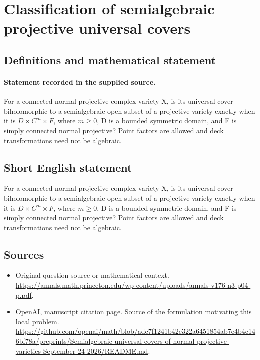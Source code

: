 \documentclass[11pt]{article}
\begin{document}
\section*{Classification of semialgebraic projective universal covers}\label{30007062}
\subsection{Definitions and mathematical statement}
\paragraph{Statement recorded in the supplied source.}
For a connected normal projective complex variety X, is its universal cover biholomorphic to a semialgebraic open subset of a projective variety exactly when it is $D×C^m×F$, where $m\geq 0$, D is a bounded symmetric domain, and F is simply connected normal projective? Point factors are allowed and deck transformations need not be algebraic.
\subsection{Short English statement}
For a connected normal projective complex variety X, is its universal cover biholomorphic to a semialgebraic open subset of a projective variety exactly when it is $D×C^m×F$, where $m\geq 0$, D is a bounded symmetric domain, and F is simply connected normal projective? Point factors are allowed and deck transformations need not be algebraic.
\subsection{Sources}
\begin{itemize}
\item[S1] Original question source or mathematical context.
\url{https://annals.math.princeton.edu/wp-content/uploads/annals-v176-n3-p04-p.pdf}.
\item[S2] OpenAI, manuscript citation page. Source of the formulation motivating this local problem.
\url{https://github.com/openai/math/blob/adc7f1241b42e322a6451854ab7e4b4c146bf78a/preprints/Semialgebraic-universal-covers-of-normal-projective-varieties-September-24-2026/README.md}.
\end{itemize}
\end{document}
